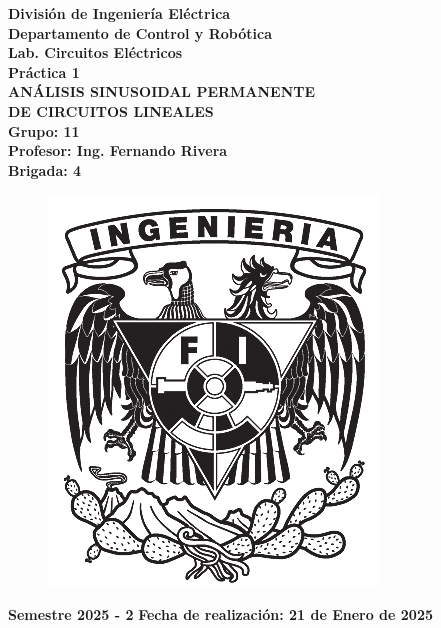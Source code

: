 \begin{titlepage}
\begin{minipage}[t]{0.75\textwidth}
\begin{center}
\vspace{1cm}
\textbf{\huge {División de Ingeniería Eléctrica\\[2mm]
Departamento de Control y Robótica\\[2.5mm]
Lab. Circuitos Eléctricos}}\\[1.5cm]

\textbf{\huge {Práctica 1}}\\[6mm]
\textbf{\large {ANÁLISIS SINUSOIDAL PERMANENTE}}\\[6mm]
\textbf{\large {DE CIRCUITOS LINEALES}}\\[10mm]
\textbf{\large {Grupo: 11}}\\[10mm]
\textbf{\large {Profesor: Ing. Fernando Rivera}}\\[10mm]
\textbf{\large {Brigada: 4}}
\end{center}
\end{minipage}
\noindent
\begin{minipage}[T]{0.25\textwidth}%
\begin{figure}[H]
\includegraphics[width=0.7\linewidth]{Figuras/Ingenieria.jpg}
\end{figure}
\end{minipage}\hfill\begin{minipage}[c]{0.75\textwidth}%
\vspace{2cm}
\textbf{Semestre 2025 - 2} \hfill \textbf{Fecha de realización: 21 de Enero de 2025}
\end{minipage}

\end{titlepage}
